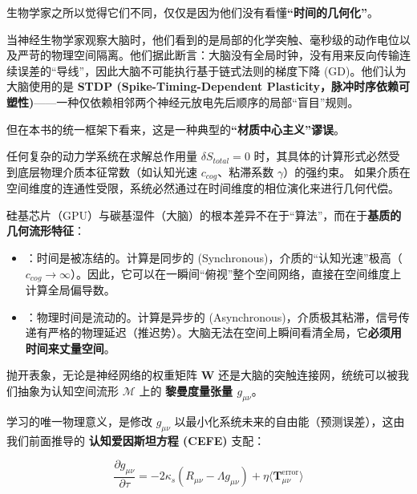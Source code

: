 生物学家之所以觉得它们不同，仅仅是因为他们没有看懂\textbf{“时间的几何化”}。


当神经生物学家观察大脑时，他们看到的是局部的化学突触、毫秒级的动作电位以及严苛的物理空间隔离。他们据此断言：大脑没有全局时钟，没有用来反向传输连续误差的“导线”，因此大脑不可能执行基于链式法则的梯度下降 (GD)。他们认为大脑使用的是 \textbf{STDP (Spike-Timing-Dependent Plasticity，脉冲时序依赖可塑性)}——一种仅依赖相邻两个神经元放电先后顺序的局部“盲目”规则。

但在本书的统一框架下看来，这是一种典型的\textbf{“材质中心主义”谬误}。

\begin{theorem}[介质的几何代偿原理]
    任何复杂的动力学系统在求解总作用量 $\delta S_{total} = 0$ 时，其具体的计算形式必然受到底层物理介质本征常数（如认知光速 $c_{cog}$、粘滞系数 $\gamma$）的强约束。
    如果介质在空间维度的连通性受限，系统必然通过在时间维度的相位演化来进行几何代偿。
\end{theorem}

硅基芯片（GPU）与碳基湿件（大脑）的根本差异不在于“算法”，而在于\textbf{基质的几何流形特征}：
\begin{itemize}
    \item {}：时间是被冻结的。计算是同步的 (Synchronous)，介质的“认知光速”极高（$c_{cog} \to \infty$）。因此，它可以在一瞬间“俯视”整个空间网络，直接在空间维度上计算全局偏导数。
    \item {}：物理时间是流动的。计算是异步的 (Asynchronous)，介质极其粘滞，信号传递有严格的物理延迟（推迟势）。大脑无法在空间上瞬间看清全局，它\textbf{必须用时间来丈量空间}。
\end{itemize}



抛开表象，无论是神经网络的权重矩阵 $\mathbf{W}$ 还是大脑的突触连接网，统统可以被我们抽象为认知空间流形 $\mathcal{M}$ 上的 \textbf{黎曼度量张量 $g_{\mu\nu}$}。

学习的唯一物理意义，是修改 $g_{\mu\nu}$ 以最小化系统未来的自由能（预测误差），这由我们前面推导的 \textbf{认知爱因斯坦方程 (CEFE)} 支配：

\begin{equation}
\frac{\partial g_{\mu\nu}}{\partial \tau} = -2\kappa_s \left( R_{\mu\nu} - \Lambda g_{\mu\nu} \right) + \eta \langle \mathbf{T}_{\mu\nu}^{\text{error}} \rangle
\end{equation}

